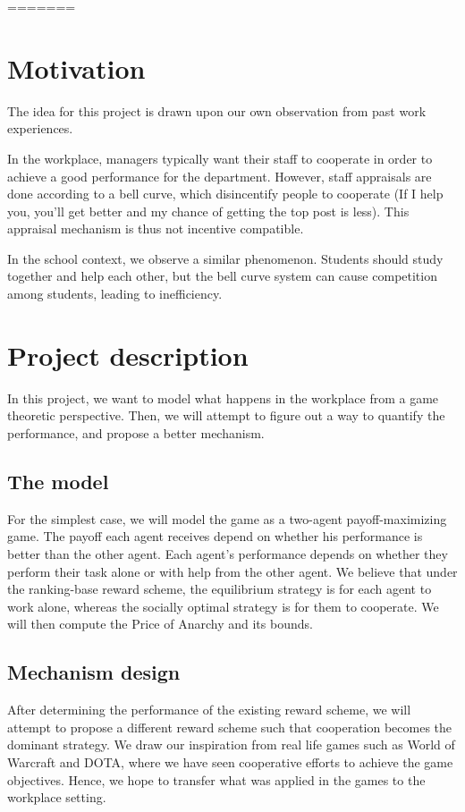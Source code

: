 \documentclass[11pt, a4paper]{article}
\begin{document}
	
	
=======

\maketitle


\section{Motivation}
The idea for this project is drawn upon our own observation from past work experiences. 

In the workplace, managers typically want their staff to cooperate in order to achieve a good performance for the department. However, staff appraisals are done according to a bell curve, which disincentify people to cooperate (If I help you, you'll get better and my chance of getting the top post is less). This appraisal mechanism is thus not incentive compatible. 

In the school context, we observe a similar phenomenon. Students should study together and help each other, but the bell curve system can cause competition among students, leading to inefficiency.

\section{Project description}
In this project, we want to model what happens in the workplace from a game theoretic perspective. Then, we will attempt to figure out a way to quantify the performance, and propose a better mechanism.

\subsection{The model}
For the simplest case, we will model the game as a two-agent payoff-maximizing game. The payoff each agent receives depend on whether his performance is better than the other agent. Each agent's performance depends on whether they perform their task alone or with help from the other agent. We believe that under the ranking-base reward scheme, the equilibrium strategy is for each agent to work alone, whereas the socially optimal strategy is for them to cooperate. We will then compute the Price of Anarchy and its bounds.

\subsection{Mechanism design}
After determining the performance of the existing reward scheme, we will attempt to propose a different reward scheme such that cooperation becomes the dominant strategy. We draw our inspiration from real life games such as World of Warcraft and DOTA, where we have seen cooperative efforts to achieve the game objectives. Hence, we hope to transfer what was applied in the games to the workplace setting.
\end{document}
